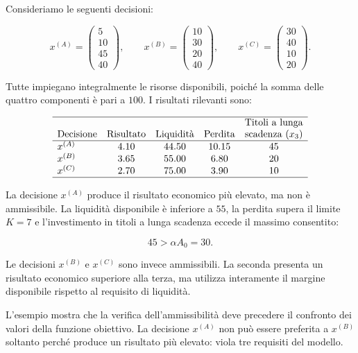 \begin{example}

Consideriamo le seguenti decisioni:

\[
x^{(A)}
=
\begin{pmatrix}
5\\
10\\
45\\
40
\end{pmatrix},
\qquad
x^{(B)}
=
\begin{pmatrix}
10\\
30\\
20\\
40
\end{pmatrix},
\qquad
x^{(C)}
=
\begin{pmatrix}
30\\
40\\
10\\
20
\end{pmatrix}.
\]

Tutte impiegano integralmente le risorse disponibili, poich\'e la somma delle
quattro componenti \`e pari a \(100\). I risultati rilevanti sono:

\[
\begin{array}{lcccc}
\hline
& 
&
&
&
\text{Titoli a lunga}
\\
\text{Decisione} & \text{Risultato} & \text{Liquidit\`{a}} & \text{Perdita}
& \text{scadenza $(x_3)$}
\\
\hline
x^{(A)}
&
4.10
&
44.50
&
10.15
&
45
\\
x^{(B)}
&
3.65
&
55.00
&
6.80
&
20
\\
x^{(C)}
&
2.70
&
75.00
&
3.90
&
10
\\
\hline
\end{array}
\]

La decisione \(x^{(A)}\) produce il risultato economico pi\`u elevato, ma non
\`e ammissibile. La liquidit\`a disponibile \`e inferiore a \(55\), la perdita
supera il limite \(K=7\) e l'investimento in titoli a lunga scadenza eccede il
massimo consentito:

\[
45>\alpha A_0=30.
\]

Le decisioni \(x^{(B)}\) e \(x^{(C)}\) sono invece ammissibili. La seconda
presenta un risultato economico superiore alla terza, ma utilizza interamente
il margine disponibile rispetto al requisito di liquidit\`a.

\end{example}

L'esempio mostra che la verifica dell'ammissibilit\`a deve precedere il
confronto dei valori della funzione obiettivo. La decisione \(x^{(A)}\) non
pu\`o essere preferita a \(x^{(B)}\) soltanto perch\'e produce un risultato
pi\`u elevato: viola tre requisiti del modello.

